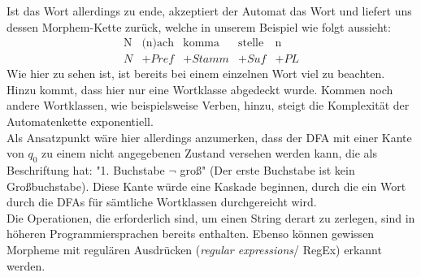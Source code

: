 \documentclass[12pt,twoside]{article}
\theoremstyle{plain}
\theoremstyle{definition}
\theoremstyle{remark}
\begin{document}
Ist das Wort allerdings zu ende, akzeptiert der Automat das Wort und liefert uns dessen Morphem-Kette zurück, welche in unserem Beispiel wie folgt aussieht:
\begin{equation*}
\begin{array}{ccccc}
	\text{N} & \text{(n)ach} & \text{komma} & \text{stelle} & \text{n}	\\
	N & +Pref & +Stamm & +Suf & +PL
\end{array}
\end{equation*}
Wie hier zu sehen ist, ist bereits bei einem einzelnen Wort viel zu beachten.
Hinzu kommt, dass hier nur eine Wortklasse abgedeckt wurde.
Kommen noch andere Wortklassen, wie beispielsweise Verben, hinzu, steigt die Komplexität der Automatenkette exponentiell.\\
Als Ansatzpunkt wäre hier allerdings anzumerken, dass der DFA mit einer Kante von $q_0$ zu einem nicht angegebenen Zustand versehen werden kann, die als Beschriftung hat: "1. Buchstabe $\lnot$ groß" (Der erste Buchstabe ist kein Großbuchstabe).
Diese Kante würde eine Kaskade beginnen, durch die ein Wort durch die DFAs für sämtliche Wortklassen durchgereicht wird.\\
Die Operationen, die erforderlich sind, um einen String derart zu zerlegen, sind in höheren Programmiersprachen bereits enthalten.
Ebenso können gewissen Morpheme mit regulären Ausdrücken (\textit{regular expressions}/ RegEx) erkannt werden.
\end{document}
